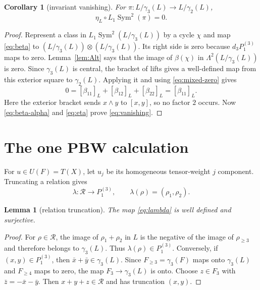 \documentclass[11pt]{amsart}
\newtheorem{lemma}[theorem]{Lemma}
\newtheorem{corollary}[theorem]{Corollary}
\newcommand{\Sym}{\operatorname{Sym}}
\newcommand{\gm}{\gamma}
\newcommand{\Rel}{\mathcal R}
\begin{document}
\begin{corollary}[invariant vanishing]\label{cor:vanishing}
For $\pi:L/\gm_3(L)\to L/\gm_2(L)$,
\begin{equation}\label{eq:vanishing}
 \eta_L\circ L_1\Sym^2(\pi)=0.
\end{equation}
\end{corollary}

\begin{proof}
Represent a class in $L_1\Sym^2(L/\gm_3(L))$ by a cycle $\chi$ and
map \eqref{eq:beta} to
$(L/\gm_3(L))\otimes(L/\gm_3(L))$.  Its right side is zero because
$d_3P^{(3)}_1$ maps to zero.  Lemma~\ref{lem:Alt} says that the image
of $\beta(\chi)$ in $\Lambda^2(L/\gm_3(L))$ is zero.  Since
$\gm_3(L)$ is central, the bracket of lifts gives a well-defined map
from this exterior square to $\gm_2(L)$.  Applying it and using
\eqref{eq:mixed-zero} gives
\[
 0=[\beta_{11}]_L+[\beta_{12}]_L+[\beta_{22}]_L=[\beta_{11}]_L.
\]
Here the exterior bracket sends $x\wedge y$ to $[x,y]$, so no factor
$2$ occurs.  Now
\eqref{eq:beta-alpha} and \eqref{eq:eta} prove \eqref{eq:vanishing}.
\end{proof}

\section{The one PBW calculation}

For $u\in U(F)=T(X)$, let $u_j$ be its homogeneous tensor-weight
$j$ component.  Truncating a relation gives
\begin{equation}\label{eq:lambda}
 \lambda:\Rel\longrightarrow P^{(3)}_1,
 \qquad \lambda(\rho)=(\rho_1,\rho_2).
\end{equation}

\begin{lemma}[relation truncation]\label{lem:lambda}
The map \eqref{eq:lambda} is well defined and surjective.
\end{lemma}

\begin{proof}
For $\rho\in\Rel$, the image of $\rho_1+\rho_2$ in $L$ is the
negative of the image of $\rho_{\geq3}$ and therefore belongs to
$\gm_3(L)$.  Thus $\lambda(\rho)\in P^{(3)}_1$.  Conversely, if
$(x,y)\in P^{(3)}_1$, then $\bar x+\bar y\in\gm_3(L)$.  Since
$F_{\geq3}=\gm_3(F)$ maps onto $\gm_3(L)$ and $F_{\geq4}$ maps to
zero, the map $F_3\to\gm_3(L)$ is onto.  Choose $z\in F_3$ with
$\bar z=-\bar x-\bar y$.  Then $x+y+z\in\Rel$ and has truncation
$(x,y)$.
\end{proof}
\end{document}
